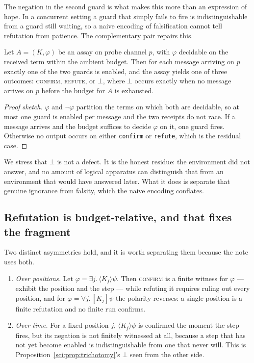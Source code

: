 The negation in the second guard is what makes this more than an expression of hope. In a concurrent
setting a guard that simply fails to fire is indistinguishable from a guard still waiting, so a naive
encoding of falsification cannot tell refutation from patience. The complementary pair repairs this.

\begin{proposition}[Trichotomy]
\label{sci:prop:trichotomy}
Let $A = (K,\varphi)$ be an assay on probe channel $p$, with $\varphi$ decidable on the received term
within the ambient budget. Then for each message arriving on $p$ exactly one of the two guards is
enabled, and the assay yields one of three outcomes: \textsc{confirm}, \textsc{refute}, or $\bot$,
where $\bot$ occurs exactly when no message arrives on $p$ before the budget for $A$ is exhausted.
\end{proposition}

\begin{proof}[Proof sketch]
$\varphi$ and $\lnot\varphi$ partition the terms on which both are decidable, so at most one guard is
enabled per message and the two receipts do not race. If a message arrives and the budget suffices to
decide $\varphi$ on it, one guard fires. Otherwise no output occurs on either \texttt{confirm} or
\texttt{refute}, which is the residual case.
\end{proof}

We stress that $\bot$ is not a defect. It is the honest residue: the environment did not answer, and
no amount of logical apparatus can distinguish that from an environment that would have answered
later. What it does is separate that genuine ignorance from falsity, which the naive encoding conflates.

\subsection{Refutation is budget-relative, and that fixes the fragment}\label{sci:S4.3}

\begin{proposition}
\label{sci:prop:asymmetry}
Two distinct asymmetries hold, and it is worth separating them because the note uses both.
\begin{enumerate}
\item \emph{Over positions.} Let $\varphi = \exists j.\,\langle K_j \rangle \psi$. Then
\textsc{confirm} is a finite witness for $\varphi$ --- exhibit the position and the step --- while
refuting it requires ruling out every position, and for $\varphi = \forall j.\,[K_j]\psi$ the
polarity reverses: a single position is a finite refutation and no finite run confirms.
\item \emph{Over time.} For a fixed position $j$, $\langle K_j\rangle\psi$ is confirmed the moment
the step fires, but its negation is not finitely witnessed at all, because a step that has not yet
become enabled is indistinguishable from one that never will. This is Proposition~\ref{sci:prop:trichotomy}'s
$\bot$ seen from the other side.
\end{enumerate}
\end{proposition}

